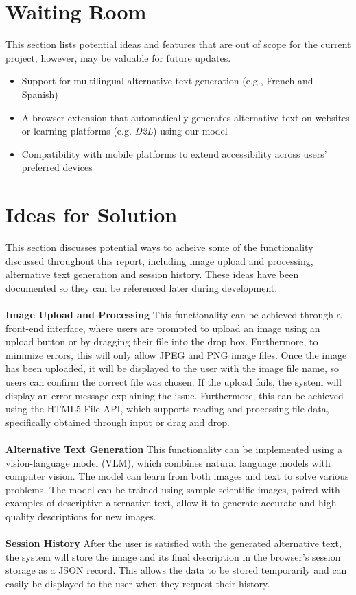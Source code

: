 \documentclass[12pt]{article}
\begin{document}
\section{Waiting Room}
This section lists potential ideas and features that are out of scope
for the current project, however, may be valuable for future updates.
\begin{itemize}
  \item Support for multilingual alternative text generation (e.g.,
    French and Spanish)
  \item A browser extension that automatically generates alternative
    text on websites or learning platforms (e.g. \textit{D2L}) using our model
  \item Compatibility with mobile platforms to extend accessibility
    across users' preferred devices
\end{itemize}

\section{Ideas for Solution}
This section discusses potential ways to acheive some of the
functionality discussed throughout this report,
including image upload and processing, alternative text generation
and session history.
These ideas have been documented so they can be referenced later
during development.\\
\\
\textbf{Image Upload and Processing}
This functionality can be achieved through a front-end interface,
where users are prompted to upload an image using an upload button or
by dragging their file into the drop box. Furthermore, to minimize
errors, this will only allow JPEG and PNG image files.
Once the image has been uploaded, it will be displayed to the user
with the image file name, so users can confirm the correct file was chosen.
If the upload fails, the system will display an error message
explaining the issue. Furthermore, this can be achieved using the
HTML5 File API, which supports reading and processing file data,
specifically obtained through input or drag and drop. \\
\\
\textbf{Alternative Text Generation}
This functionality can be implemented using a vision-language model
(VLM), which combines natural language models with computer vision.
The model can learn from both images and text to solve various
problems. The model can be trained using sample scientific images,
paired with examples of descriptive alternative text, allow it to
generate accurate and high quality descriptions for new images.\\
\\
\textbf{Session History}
After the user is satisfied with the generated alternative text, the
system will store the image and its final description in the
browser's session storage as a JSON record. This allows the data to
be stored temporarily and can easily be displayed to the user when
they request their history. \\
\end{document}
